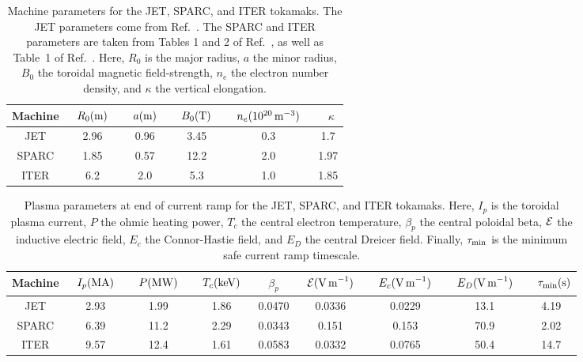 \documentclass[12pt,prb,aps]{revtex4-1}
\begin{document}
\newpage 
\begin{table}
\begin{tabular}{cccccc}\hline
Machine & ~$R_0({\rm m})$~ & ~$a({\rm m})$~ & ~$B_0({\rm T})$~ & ~$n_e(10^{20}\,{\rm m}^{-3})$~ & ~$\kappa$\\ \hline
JET & 2.96 & 0.96 & 3.45 & 0.3& 1.7\\[0.5ex]
SPARC & 1.85 & 0.57 & 12.2 & 2.0 & 1.97\\[0.5ex]
ITER & 6.2 & 2.0 & 5.3 & 1.0 & 1.85
\end{tabular}
\caption{Machine parameters for the JET, SPARC, and ITER tokamaks. 
The JET parameters come from Ref.~. 
The SPARC and ITER parameters are taken from Tables 1 and 2 of Ref.~, as well as Table~1 of Ref.~. 
Here, $R_0$ is the major radius, $a$ the minor radius, $B_0$ the toroidal magnetic field-strength, $n_e$ the electron number
density, and $\kappa$ the vertical elongation.}\label{t1}
\end{table}

\begin{table}
\begin{tabular}{ccccccccc}\hline
Machine & ~$I_p({\rm MA})$~ & ~$P({\rm MW})$~ & ~$T_c({\rm keV})$~ &~$\beta_p$~& ~${\cal E}({\rm V\,m}^{-1})$~ & ~$E_c({\rm V\,m}^{-1})$~ & ~$E_D({\rm V\,m}^{-1})$~& ~$\tau_{\rm min}({\rm s)}$\\ \hline
JET & 2.93 & 1.99 & 1.86  &0.0470& 0.0336&0.0229&13.1 & 4.19\\[0.5ex]
SPARC & 6.39& 11.2 & 2.29  &0.0343& 0.151&0.153&70.9& 2.02\\[0.5ex]
ITER & 9.57 & 12.4 & 1.61  &0.0583& 0.0332&0.0765& 50.4&14.7
\end{tabular}
\caption{Plasma parameters at end of current ramp for the JET, SPARC, and ITER tokamaks. Here, $I_p$ is the toroidal plasma current, $P$ the
ohmic heating power, $T_c$ the central electron temperature, $\beta_p$ the central poloidal beta, ${\cal E}$ the inductive
electric field, $E_c$ the Connor-Hastie field, and $E_D$ the central Dreicer field. Finally, $\tau_{\rm min}$ is the minimum safe current ramp timescale.  }\label{t2}
\end{table}
\end{document}
